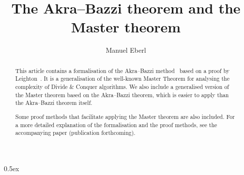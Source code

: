 \documentclass[11pt,a4paper]{article}
\begin{document}
\title{The Akra--Bazzi theorem and the Master theorem}
\author{Manuel Eberl}
\maketitle

\begin{abstract}
This article contains a formalisation of the Akra--Bazzi method~\cite{akrabazzi} based on a proof by Leighton~\cite{leighton}. It is a generalisation of the well-known Master Theorem for analysing the complexity of Divide \& Conquer algorithms. We also include a generalised version of the Master theorem based on the Akra--Bazzi theorem, which is easier to apply than the Akra--Bazzi theorem itself.

Some proof methods that facilitate applying the Master theorem are also included. For a more detailed explanation of the formalisation and the proof methods, see the accompanying paper (publication forthcoming).
\end{abstract}

\tableofcontents

\parindent 0pt\parskip 0.5ex





\end{document}
